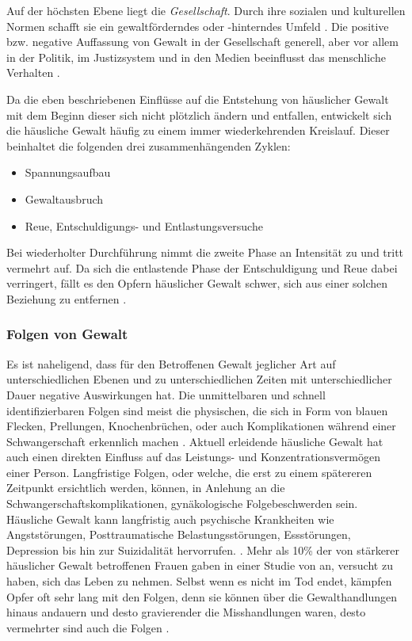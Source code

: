 Auf der höchsten Ebene liegt die \textit{Gesellschaft}. Durch ihre sozialen und kulturellen Normen schafft sie ein gewaltförderndes oder -hinterndes Umfeld \parencite{Ursache_hG_2, Ursache_hG, Gewaltart}. Die positive bzw. negative Auffassung von Gewalt in der Gesellschaft generell, aber vor allem in der Politik, im Justizsystem und in den Medien beeinflusst das menschliche Verhalten \parencite{Ursache_hG_2, Ursache_hG}.  

Da die eben beschriebenen Einflüsse auf die Entstehung von häuslicher Gewalt mit dem Beginn dieser sich nicht plötzlich ändern und entfallen, entwickelt sich die häusliche Gewalt häufig zu einem immer wiederkehrenden Kreislauf. Dieser beinhaltet die folgenden drei zusammenhängenden Zyklen: 

\begin{itemize}
    \item Spannungsaufbau
    \item Gewaltausbruch
    \item Reue, Entschuldigungs- und Entlastungsversuche
\end{itemize}

Bei wiederholter Durchführung nimmt die zweite Phase an Intensität zu und tritt vermehrt auf. Da sich die entlastende Phase der Entschuldigung und Reue dabei verringert, fällt es den Opfern häuslicher Gewalt schwer, sich aus einer solchen Beziehung zu entfernen \parencite{Def_haus_Gewalt}.


\subsubsection{Folgen von Gewalt}     \label{2.1.2.3}
Es ist naheligend, dass für den Betroffenen Gewalt jeglicher Art auf unterschiedlichen Ebenen und zu unterschiedlichen Zeiten mit unterschiedlicher Dauer negative Auswirkungen hat. Die unmittelbaren und schnell identifizierbaren Folgen sind meist die physischen, die sich in Form von blauen Flecken, Prellungen, Knochenbrüchen, oder auch Komplikationen während einer Schwangerschaft erkennlich machen \parencite{Def_Form_Folge_Gewalt, Gewaltart}. Aktuell erleidende häusliche Gewalt hat auch einen direkten Einfluss auf das Leistungs- und Konzentrationsvermögen einer Person. Langfristige Folgen, oder welche, die erst zu einem spätereren Zeitpunkt ersichtlich werden, können, in Anlehung an die Schwangerschaftskomplikationen, gynäkologische Folgebeschwerden sein. Häusliche Gewalt kann langfristig auch psychische Krankheiten wie Angststörungen, Posttraumatische Belastungsstörungen, Essstörungen, Depression bis hin zur Suizidalität hervorrufen. \parencite{Def_Form_Folge_Gewalt, Gewaltart}. Mehr als 10\% der von stärkerer häuslicher Gewalt betroffenen Frauen gaben in einer Studie von \textcite{psy_Folgen_hG} an, versucht zu haben, sich das Leben zu nehmen. Selbst wenn es nicht im Tod endet, kämpfen Opfer oft sehr lang mit den Folgen, denn sie können über die Gewalthandlungen hinaus andauern \parencite{Def_haus_Gewalt} und desto gravierender die Misshandlungen waren, desto vermehrter sind auch die Folgen \parencite{Gewaltart}.

